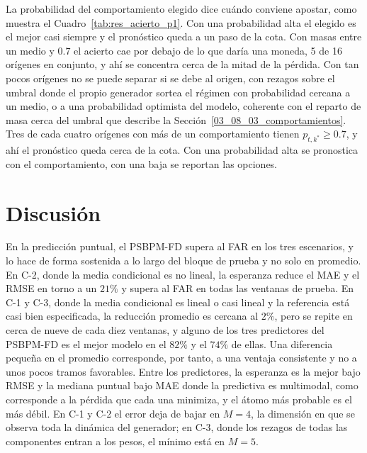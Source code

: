 La probabilidad del comportamiento elegido dice cuándo conviene apostar, como muestra el Cuadro~\ref{tab:res_acierto_p1}. Con una probabilidad alta el elegido es el mejor casi siempre y el pronóstico queda a un paso de la cota. Con masas entre un medio y $0.7$ el acierto cae por debajo de lo que daría una moneda, 5 de 16 orígenes en conjunto, y ahí se concentra cerca de la mitad de la pérdida. Con tan pocos orígenes no se puede separar si se debe al origen, con rezagos sobre el umbral donde el propio generador sortea el régimen con probabilidad cercana a un medio, o a una probabilidad optimista del modelo, coherente con el reparto de masa cerca del umbral que describe la Sección~\ref{03_08_03_comportamientos}. Tres de cada cuatro orígenes con más de un comportamiento tienen $p_{t,k^{*}} \ge 0.7$, y ahí el pronóstico queda cerca de la cota. Con una probabilidad alta se pronostica con el comportamiento, con una baja se reportan las opciones.

\section{Discusión}
\label{03_09}

En la predicción puntual, el PSBPM-FD supera al FAR en los tres escenarios, y lo hace de forma sostenida a lo largo del bloque de prueba y no solo en promedio. En C-2, donde la media condicional es no lineal, la esperanza reduce el MAE y el RMSE en torno a un $21\%$ y supera al FAR en todas las ventanas de prueba. En C-1 y C-3, donde la media condicional es lineal o casi lineal y la referencia está casi bien especificada, la reducción promedio es cercana al $2\%$, pero se repite en cerca de nueve de cada diez ventanas, y alguno de los tres predictores del PSBPM-FD es el mejor modelo en el $82\%$ y el $74\%$ de ellas. Una diferencia pequeña en el promedio corresponde, por tanto, a una ventaja consistente y no a unos pocos tramos favorables. Entre los predictores, la esperanza es la mejor bajo RMSE y la mediana puntual bajo MAE donde la predictiva es multimodal, como corresponde a la pérdida que cada una minimiza, y el átomo más probable es el más débil. En C-1 y C-2 el error deja de bajar en $M = 4$, la dimensión en que se observa toda la dinámica del generador; en C-3, donde los rezagos de todas las componentes entran a los pesos, el mínimo está en $M = 5$.\\

